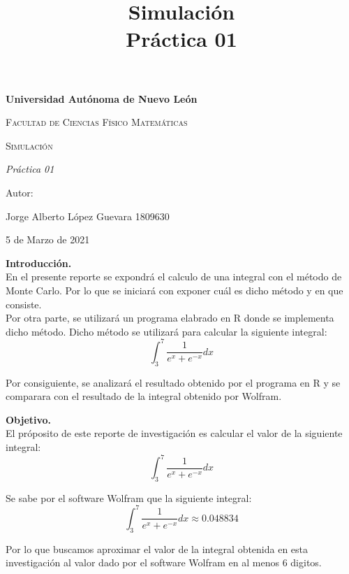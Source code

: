 \documentclass{report}
\begin{document}
\title{\bf Simulación \\ Práctica 01} 

\begin{titlepage}
\centering
{\bfseries\LARGE Universidad Autónoma de Nuevo León \par}
\vspace{1cm}
{\scshape\Large Facultad de Ciencias Físico Matemáticas \par}
\vspace{3cm}
{\scshape\Huge Simulación \par}
\vspace{3cm}
{\itshape\Large Práctica 01 \par}
\vfill
{\Large Autor: \par}
{\Large Jorge Alberto López Guevara \hspace{1cm} 1809630 \par}
\vfill
{\Large 5 de Marzo de 2021 \par}
\end{titlepage}

\newpage


\noindent \Large \textbf{Introducción.} \\

\noindent En el presente reporte se expondrá el calculo de una integral con el método de Monte Carlo. Por lo que se iniciará con exponer cuál es dicho método y en que consiste.\\

\noindent Por otra parte, se utilizará un programa elabrado en R donde se implementa dicho método. Dicho método se utilizará para calcular la siguiente integral:
$$\int_{3}^{7}\frac{1}{e^{x}+e^{-x}}dx$$

\noindent Por consiguiente, se analizará el resultado obtenido por el programa en R y se comparara con el resultado de la integral obtenido por Wolfram.

\newpage
\noindent \Large \textbf{Objetivo.} \\

\noindent El próposito de este reporte de investigación es calcular el valor de la siguiente integral:
$$\int_{3}^{7}\frac{1}{e^{x}+e^{-x}}dx$$

\noindent Se sabe por el software Wolfram que la siguiente integral:
$$\int_{3}^{7}\frac{1}{e^{x}+e^{-x}}dx \approx  0.048834$$

\noindent Por lo que buscamos aproximar el valor de la integral obtenida en esta investigación al valor dado por el software Wolfram en al menos 6 digitos. \\
\end{document}
